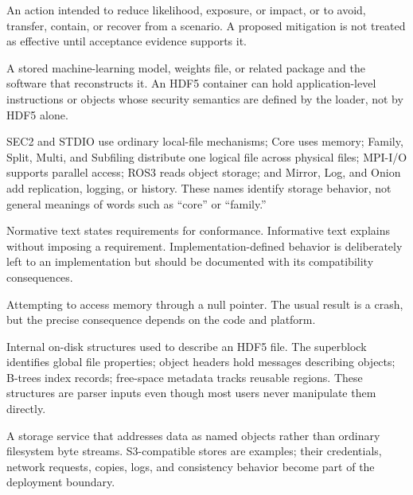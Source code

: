 \documentclass[../main.tex]{subfiles}
\begin{document}
\begin{description}[leftmargin=1.5em,style=nextline]
\item[Mitigation / treatment.]
An action intended to reduce likelihood, exposure, or impact, or to avoid,
transfer, contain, or recover from a scenario. A proposed mitigation is not
treated as effective until acceptance evidence supports it.

\item[Model artifact / model loader.]
A stored machine-learning model, weights file, or related package and the
software that reconstructs it. An HDF5 container can hold application-level
instructions or objects whose security semantics are defined by the loader,
not by HDF5 alone.

\item[Named VFD families.]
SEC2 and STDIO use ordinary local-file mechanisms; Core uses memory; Family,
Split, Multi, and Subfiling distribute one logical file across physical files;
MPI-I/O supports parallel access; ROS3 reads object storage; and Mirror, Log,
and Onion add replication, logging, or history. These names identify storage
behavior, not general meanings of words such as ``core'' or ``family.''

\item[Normative / informative / implementation-defined.]
Normative text states requirements for conformance. Informative text explains
without imposing a requirement. Implementation-defined behavior is deliberately
left to an implementation but should be documented with its compatibility
consequences.

\item[Null dereference.]
Attempting to access memory through a null pointer. The usual result is a crash,
but the precise consequence depends on the code and platform.

\item[Object header / superblock / B-tree / free-space metadata.]
Internal on-disk structures used to describe an HDF5 file. The superblock
identifies global file properties; object headers hold messages describing
objects; B-trees index records; free-space metadata tracks reusable regions.
These structures are parser inputs even though most users never manipulate
them directly.

\item[Object store.]
A storage service that addresses data as named objects rather than ordinary
filesystem byte streams. S3-compatible stores are examples; their credentials,
network requests, copies, logs, and consistency behavior become part of the
deployment boundary.


\end{description}
\end{document}
